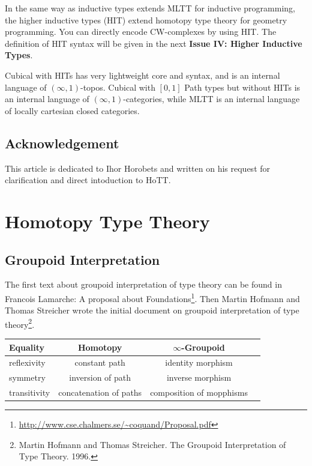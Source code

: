 \documentclass{article}
\theoremstyle{definition}
\begin{document}
In the same way as inductive types extends MLTT for inductive programming,
the higher inductive types (HIT) extend homotopy type theory for geometry programming.
You can directly encode CW-complexes by using HIT. The definition of HIT syntax will
be given in the next {\bf Issue IV: Higher Inductive Types}.

Cubical with HITs has very lightweight core and syntax, and
is an internal language of $(\infty,1)$-topos.
Cubical with $[0,1]$ Path types but without HITs is an
internal language of $(\infty,1)$-categories, while MLTT
is an internal language of locally cartesian closed categories.

\subsection{Acknowledgement}
This article is dedicated to Ihor Horobets and written on his
request for clarification and direct intoduction to HoTT.

\newpage
\section{Homotopy Type Theory}

\subsection{Groupoid Interpretation}
The first text about groupoid interpretation of type theory can be found in Francois Lamarche:
A proposal about Foundations\footnote{\url{http://www.cse.chalmers.se/~coquand/Proposal.pdf}}.
Then Martin Hofmann and Thomas Streicher wrote the initial
document on groupoid interpretation of type
theory\footnote{Martin Hofmann and Thomas Streicher. The Groupoid Interpretation of Type Theory. 1996.}.

\begin{table}[H]
\begin{center}
\begin{tabular}{lccc}
\hline
{\bf Equality} & {\bf Homotopy} & {\bf $\infty$-Groupoid} \\
\hline
reflexivity  & constant path & identity morphism \\
symmetry     & inversion of path & inverse morphism \\
transitivity & concatenation of paths & composition of mopphisms \\
\hline
\end{tabular}
\end{center}
\end{table}
\end{document}
